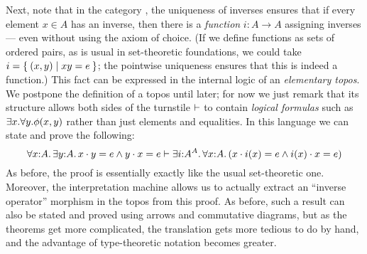 Next, note that in the category \bSet, the uniqueness of inverses ensures that if every element $x\in A$ has an inverse, then there is a \emph{function} $i:A\to A$ assigning inverses --- even without using the axiom of choice.
(If we define functions as sets of ordered pairs, as is usual in set-theoretic foundations, we could take $i = \Set{(x,y) | xy=e}$; the pointwise uniqueness ensures that this is indeed a function.)
This fact can be expressed in the internal logic of an \emph{elementary topos}.
We postpone the definition of a topos until later; for now we just remark that its structure allows both sides of the turnstile $\vdash$ to contain \emph{logical formulas} such as $\exis x. \all y. \phi(x,y)$ rather than just elements and equalities.
In this language we can state and prove the following:
\[ \forall x:A. \exists y:A. x\cdot y = e \land y\cdot x = e \types
\exists i:A^A. \forall x:A. (x\cdot i(x) = e \land i(x)\cdot x = e)
\]
As before, the proof is essentially exactly like the usual set-theoretic one.
Moreover, the interpretation machine allows us to actually extract an ``inverse operator'' morphism in the topos from this proof.
As before, such a result can also be stated and proved using arrows and commutative diagrams, but as the theorems get more complicated, the translation gets more tedious to do by hand, and the advantage of type-theoretic notation becomes greater.

